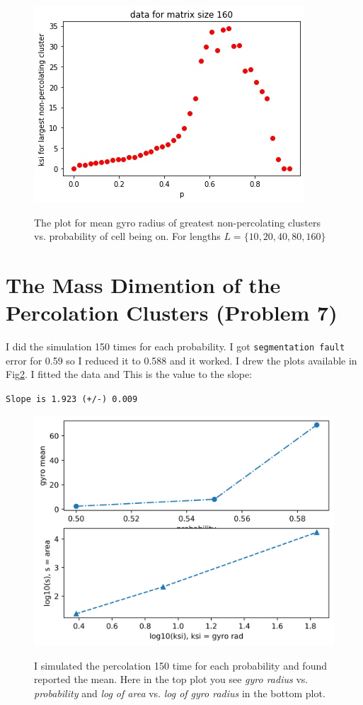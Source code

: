 \documentclass[12pt]{article}
\begin{document}
	\begin{figure}[h!]
	\centering
	\includegraphics[width=0.9\linewidth]{../p5/fig4.jpg}
	\label{fig:gyroCluster4}
	\caption{The plot for mean gyro radius  of greatest non-percolating clusters vs. probability of cell being on. For lengths $L = \{10, 20, 40, 80, 160\}$}
\end{figure}

	\section{The Mass Dimention of the Percolation Clusters (Problem 7)}
	I did the simulation 150 times for each probability. I got \texttt{segmentation fault} error for 0.59 so I reduced it to 0.588 and it worked.
	I drew the plots available in Fig\ref{fig:area-gyro}.
	I fitted the data and This is the value to the slope:\\
	\centerline{\texttt{Slope is 1.923 (+/-) 0.009}}
	\begin{figure}[h!]
		\centering
		\includegraphics[width=0.9\linewidth]{../p7/area-gyro.jpg}
		\label{fig:area-gyro}
		\caption{I simulated the percolation 150 time for each probability and found reported the mean. Here
		in the top plot you see \emph{gyro radius} vs. \emph{probability}
		and \emph{log of area} vs. \emph{log of gyro radius} in the bottom plot.}
	\end{figure}
\end{document}
